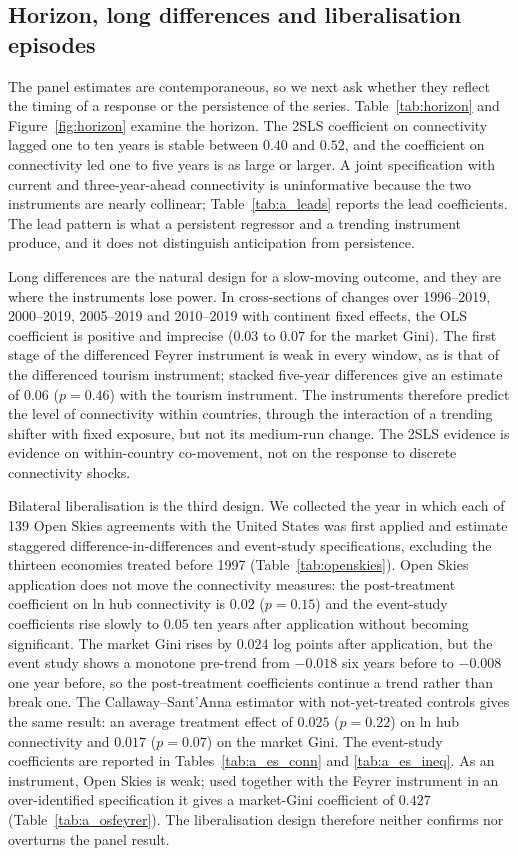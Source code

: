 \documentclass[12pt]{article}
\begin{document}
\subsection{Horizon, long differences and liberalisation episodes}
\label{sec:horizon}
The panel estimates are contemporaneous, so we next ask whether they reflect the timing of a response or the persistence of the series. Table~\ref{tab:horizon} and Figure~\ref{fig:horizon} examine the horizon. The 2SLS coefficient on connectivity lagged one to ten years is stable between $0.40$ and $0.52$, and the coefficient on connectivity led one to five years is as large or larger. A joint specification with current and three-year-ahead connectivity is uninformative because the two instruments are nearly collinear; Table~\ref{tab:a_leads} reports the lead coefficients. The lead pattern is what a persistent regressor and a trending instrument produce, and it does not distinguish anticipation from persistence.

Long differences are the natural design for a slow-moving outcome, and they are where the instruments lose power. In cross-sections of changes over 1996--2019, 2000--2019, 2005--2019 and 2010--2019 with continent fixed effects, the OLS coefficient is positive and imprecise ($0.03$ to $0.07$ for the market Gini). The first stage of the differenced Feyrer instrument is weak in every window, as is that of the differenced tourism instrument; stacked five-year differences give an estimate of $0.06$ ($p=0.46$) with the tourism instrument. The instruments therefore predict the level of connectivity within countries, through the interaction of a trending shifter with fixed exposure, but not its medium-run change. The 2SLS evidence is evidence on within-country co-movement, not on the response to discrete connectivity shocks.

Bilateral liberalisation is the third design. We collected the year in which each of 139 Open Skies agreements with the United States was first applied and estimate staggered difference-in-differences and event-study specifications, excluding the thirteen economies treated before 1997 (Table~\ref{tab:openskies}). Open Skies application does not move the connectivity measures: the post-treatment coefficient on ln hub connectivity is $0.02$ ($p=0.15$) and the event-study coefficients rise slowly to $0.05$ ten years after application without becoming significant. The market Gini rises by $0.024$ log points after application, but the event study shows a monotone pre-trend from $-0.018$ six years before to $-0.008$ one year before, so the post-treatment coefficients continue a trend rather than break one. The Callaway--Sant'Anna estimator with not-yet-treated controls gives the same result: an average treatment effect of $0.025$ ($p=0.22$) on ln hub connectivity and $0.017$ ($p=0.07$) on the market Gini. The event-study coefficients are reported in Tables~\ref{tab:a_es_conn} and \ref{tab:a_es_ineq}. As an instrument, Open Skies is weak; used together with the Feyrer instrument in an over-identified specification it gives a market-Gini coefficient of $0.427$ (Table~\ref{tab:a_osfeyrer}). The liberalisation design therefore neither confirms nor overturns the panel result.
\end{document}
